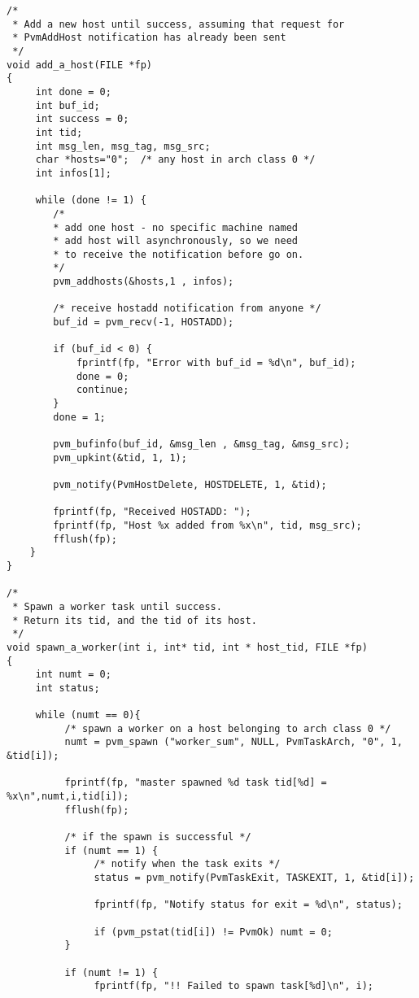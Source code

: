 \begin{verbatim}
/* 
 * Add a new host until success, assuming that request for 
 * PvmAddHost notification has already been sent 
 */
void add_a_host(FILE *fp)
{
     int done = 0;
     int buf_id;
     int success = 0;
     int tid;
     int msg_len, msg_tag, msg_src;
     char *hosts="0";  /* any host in arch class 0 */
     int infos[1];

     while (done != 1) {
        /* 
        * add one host - no specific machine named 
        * add host will asynchronously, so we need
        * to receive the notification before go on.
        */
        pvm_addhosts(&hosts,1 , infos);
      
        /* receive hostadd notification from anyone */
        buf_id = pvm_recv(-1, HOSTADD);
      
        if (buf_id < 0) {
            fprintf(fp, "Error with buf_id = %d\n", buf_id);
            done = 0;
            continue;
        }
        done = 1;
     
        pvm_bufinfo(buf_id, &msg_len , &msg_tag, &msg_src);
        pvm_upkint(&tid, 1, 1);

        pvm_notify(PvmHostDelete, HOSTDELETE, 1, &tid);

        fprintf(fp, "Received HOSTADD: ");
        fprintf(fp, "Host %x added from %x\n", tid, msg_src);
        fflush(fp);
    }
}

/* 
 * Spawn a worker task until success.  
 * Return its tid, and the tid of its host. 
 */
void spawn_a_worker(int i, int* tid, int * host_tid, FILE *fp)
{
     int numt = 0;
     int status;

     while (numt == 0){
          /* spawn a worker on a host belonging to arch class 0 */
          numt = pvm_spawn ("worker_sum", NULL, PvmTaskArch, "0", 1, &tid[i]);

          fprintf(fp, "master spawned %d task tid[%d] = %x\n",numt,i,tid[i]);
          fflush(fp);
         
          /* if the spawn is successful */
          if (numt == 1) {
               /* notify when the task exits */
               status = pvm_notify(PvmTaskExit, TASKEXIT, 1, &tid[i]);
               
               fprintf(fp, "Notify status for exit = %d\n", status);
               
               if (pvm_pstat(tid[i]) != PvmOk) numt = 0;
          }
          
          if (numt != 1) {
               fprintf(fp, "!! Failed to spawn task[%d]\n", i);
               

\end{verbatim}
